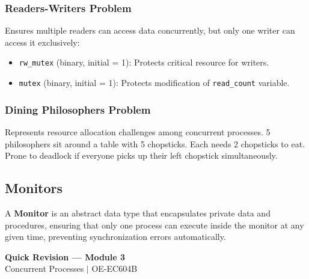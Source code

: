 \documentclass[12pt,a4paper]{article}
\begin{document}
\subsubsection{Readers-Writers Problem}
Ensures multiple readers can access data concurrently, but only one writer can access it exclusively:
\begin{itemize}[leftmargin=*, itemsep=3pt]
  \item \texttt{rw\_mutex} (binary, initial = 1): Protects critical resource for writers.
  \item \texttt{mutex} (binary, initial = 1): Protects modification of \texttt{read\_count} variable.
\end{itemize}

\subsubsection{Dining Philosophers Problem}
Represents resource allocation challenges among concurrent processes. 5 philosophers sit around a table with 5 chopsticks. Each needs 2 chopsticks to eat. Prone to deadlock if everyone picks up their left chopstick simultaneously.

\subsection{Monitors}
A \textbf{Monitor} is an abstract data type that encapsulates private data and procedures, ensuring that only one process can execute inside the monitor at any given time, preventing synchronization errors automatically.

\newpage
\begin{center}
  {\large\bfseries\color{myred} Quick Revision --- Module 3}\\[3pt]
  {\small\color{mydark} Concurrent Processes $|$ OE-EC604B}
\end{center}
\noindent{\color{myred}\rule{\linewidth}{1.2pt}}
\vspace{4pt}
\end{document}
